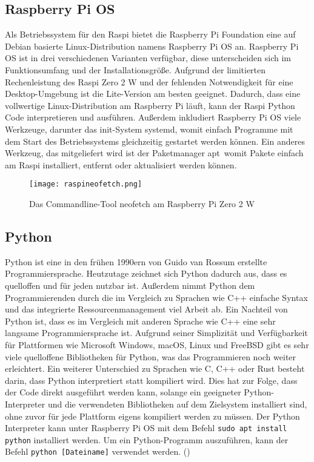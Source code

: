 \subsection{Raspberry Pi OS}
\label{subsec:tRasPiOS}
Als Betriebssystem für den \ac{Raspi} bietet die Raspberry Pi Foundation eine auf Debian basierte Linux-Distribution namens Raspberry Pi \ac{OS} an. Raspberry Pi \ac{OS} ist in drei verschiedenen Varianten verfügbar, diese unterscheiden sich im Funktionsumfang und der Installationsgröße. Aufgrund der limitierten Rechenleistung des \ac{Raspi} Zero 2 W und der fehlenden Notwendigkeit für eine Desktop-Umgebung ist die Lite-Version am besten geeignet. Dadurch, dass eine vollwertige Linux-Distribution am Raspberry Pi läuft, kann der \ac{Raspi} Python Code interpretieren und ausführen. Außerdem inkludiert Raspberry Pi OS viele Werkzeuge, darunter das init-System \glqq systemd\grqq , womit einfach Programme mit dem Start des Betriebssystems gleichzeitig gestartet werden können. Ein anderes Werkzeug, das mitgeliefert wird ist der Paketmanager \glqq apt\grqq\ womit Pakete einfach am \ac{Raspi} installiert, entfernt oder aktualisiert werden können.
\begin{figure}[h]
\centering
\texttt{[image: raspineofetch.png]}
\caption{Das Commandline-Tool neofetch am Raspberry Pi Zero 2 W}
\label{fig:pineofetch}
\end{figure}

\subsection{Python}
\label{subsec:tPython}
Python ist eine in den frühen 1990ern von Guido van Rossum erstellte Programmiersprache. Heutzutage zeichnet sich Python dadurch aus, dass es quelloffen und für jeden nutzbar ist. Außerdem nimmt Python dem Programmierenden durch die im Vergleich zu Sprachen wie C++ einfache Syntax und das integrierte Ressourcenmanagement viel Arbeit ab. Ein Nachteil von Python ist, dass es im Vergleich mit anderen Sprache wie C++ eine sehr langsame Programmiersprache ist. Aufgrund seiner Simplizität und Verfügbarkeit für Plattformen wie Microsoft Windows, macOS, Linux und FreeBSD gibt es sehr viele quelloffene Bibliotheken für Python, was das Programmieren noch weiter erleichtert. Ein weiterer Unterschied zu Sprachen wie C, C++ oder Rust besteht darin, dass Python interpretiert statt kompiliert wird. Dies hat zur Folge, dass der Code direkt ausgeführt werden kann, solange ein geeigneter Python-Interpreter und die verwendeten Bibliotheken auf dem Zielsystem installiert sind, ohne zuvor für jede Plattform eigens kompiliert werden zu müssen. Der Python Interpreter kann unter Raspberry Pi OS mit dem Befehl \verb|sudo apt install python| installiert werden. Um ein Python-Programm auszuführen, kann der Befehl \verb|python [Dateiname]| verwendet werden.
(\cite{matthes-2019})


